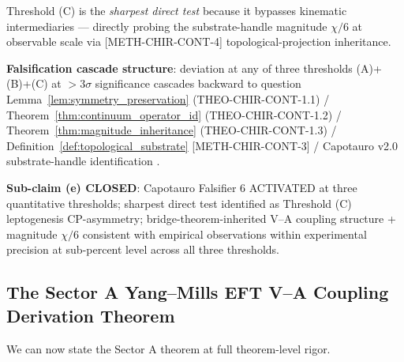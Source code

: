 \documentclass[11pt,letterpaper]{article}
\newcommand{\methref}[1]{\textsf{\small[\textsc{#1}]}}
\begin{document}
Threshold (C) is the \emph{sharpest direct test} because it bypasses kinematic intermediaries --- directly probing the substrate-handle magnitude $\chi/6$ at observable scale via \methref{METH-CHIR-CONT-4} topological-projection inheritance.

\textbf{Falsification cascade structure}: deviation at any of three thresholds (A)+(B)+(C) at $>3\sigma$ significance cascades backward to question Lemma~\ref{lem:symmetry_preservation} (THEO-CHIR-CONT-1.1) / Theorem~\ref{thm:continuum_operator_id} (THEO-CHIR-CONT-1.2) / Theorem~\ref{thm:magnitude_inheritance} (THEO-CHIR-CONT-1.3) / Definition~\ref{def:topological_substrate} \methref{METH-CHIR-CONT-3} / Capotauro v2.0 substrate-handle identification \cite{Capotauro}.

\textbf{Sub-claim (e) CLOSED}: Capotauro Falsifier 6 ACTIVATED at three quantitative thresholds; sharpest direct test identified as Threshold (C) leptogenesis CP-asymmetry; bridge-theorem-inherited V--A coupling structure + magnitude $\chi/6$ consistent with empirical observations within experimental precision at sub-percent level across all three thresholds.

\subsection{The Sector A Yang--Mills EFT V--A Coupling Derivation Theorem}
\label{sec:theorem_sector_a}

We can now state the Sector A theorem at full theorem-level rigor.
\end{document}
